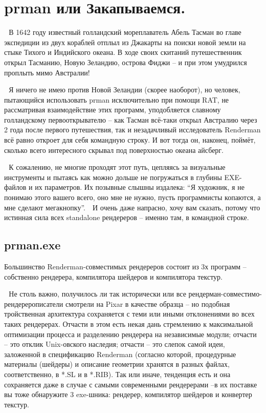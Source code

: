 \chapter*{prman или Закапываемся.}
  В 1642 году известный голландский мореплаватель
    Абель Тасман во главе экспедиции из двух кораблей отплыл из
    Джакарты на поиски новой земли на стыке Тихого и Индийского океана.
    В ходе своих скитаний путешественник открыл Тасманию, Новую
    Зеландию, острова Фиджи – и при этом умудрился проплыть мимо
    Австралии!

  Я ничего не имею против Новой Зеландии (скорее
    наоборот), но человек, пытающийся использовать prman исключительно
    при помощи RAT, не рассматривая взаимодействие этих программ,
    уподобляется славному голландскому первооткрывателю – как Тасман
    всё-таки открыл Австралию через 2 года после первого путешествия,
    так и незадачливый исследователь Renderman всё равно откроет для
    себя командную строку. И вот тогда он, наконец, поймёт, сколько
    всего интересного скрывал под поверхностью океана
    айсберг.

  К сожалению, не многие проходят этот путь, цепляясь
    за визуальные инструменты и пытаясь как можно дольше не погружаться
    в глубины EXE-файлов и их параметров. Их позывные слышны издалека:
    “Я художник, я не понимаю этого вашего всего, оно мне не нужно,
    пусть программисты копаются, а мне сделают мегакнопку”.
 
 И очень даже напрасно, хочу вам сказать, потому что
    истинная сила всех standalone рендереров – именно там, в командной
    строке.

\section*{prman.exe}

 Большинство Renderman-совместимых рендереров
    состоит из 3х программ – собственно рендерера, компилятора шейдеров
    и компилятора текстур.

  Не столь важно, получилось ли так исторически или
    все рендерман-совместимо-рендерерописатели смотрели на Pixar в
    качестве образца – но подобная тройственная архитектура сохраняется
    с теми или иными отклонениями во всех таких рендерерах. Отчасти в
    этом есть некая дань стремлению к максимальной оптимизации процесса
    и разделению рендерера на независимые модули; отчасти – это отклик
    Unix-овского наследия; отчасти – это слепок самой идеи, заложенной
    в спецификацию Renderman (согласно которой, процедурные материалы
    (шейдеры) и описание геометрии хранятся в разных файлах,
    соответственно, в *.SL и в *.RIB). Так или иначе, тенденция есть и
    она сохраняется даже в случае с самыми современными рендерерами –в
    их поставке вы тоже обнаружите 3 exe-шника: рендерер, компилятор
    шейдеров и конвертер текстур.

